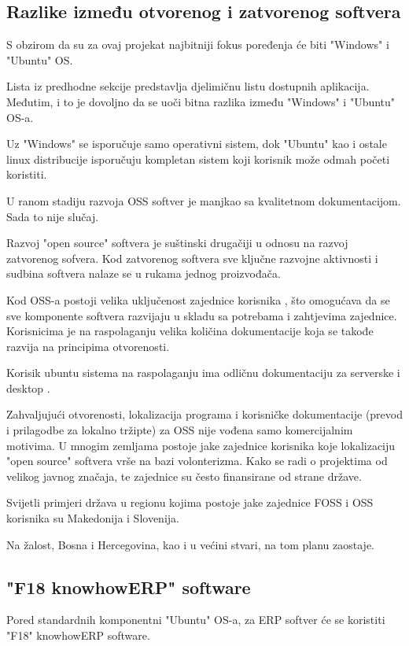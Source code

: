 \documentclass[times, utf8, seminar]{fit}
\begin{document}
 
\subsection{Razlike između otvorenog i zatvorenog softvera} 

S obzirom da su za ovaj projekat najbitniji fokus poređenja će biti "Windows" i "Ubuntu" OS. 

Lista iz predhodne sekcije predstavlja djelimičnu listu dostupnih aplikacija. Međutim, i to je dovoljno da se uoči bitna razlika između "Windows" i "Ubuntu" OS-a. 

Uz "Windows" se isporučuje samo operativni sistem, dok "Ubuntu" kao i ostale linux distribucije isporučuju kompletan sistem koji korisnik može odmah početi koristiti.

U ranom stadiju razvoja OSS softver je manjkao sa kvalitetnom dokumentacijom. Sada to nije slučaj. 

Razvoj "open source" softvera je suštinski drugačiji u odnosu na razvoj zatvorenog sofvera. Kod zatvorenog softvera sve ključne razvojne aktivnosti i sudbina softvera nalaze se u rukama jednog proizvođača.

Kod OSS-a postoji velika uključenost zajednice korisnika , što omogućava da se sve komponente softvera razvijaju u skladu sa potrebama i zahtjevima zajednice. Korisnicima je na raspolaganju velika količina dokumentacije koja se takođe razvija na principima otvorenosti.

Korisik ubuntu sistema na raspolaganju ima odličnu dokumentaciju za serverske \cite{ubuntudesktop} i desktop \cite{ubuntuserver}.

Zahvaljujući otvorenosti, lokalizacija programa i korisničke dokumentacije (prevod i prilagodbe za lokalno tržipte) za OSS nije vođena samo komercijalnim motivima. U mnogim zemljama postoje jake zajednice korisnika koje lokalizaciju "open source" softvera vrše na bazi volonterizma. Kako se radi o projektima od velikog javnog značaja, te zajednice su često finansirane od strane države.

Svijetli primjeri država u regionu kojima postoje jake zajednice FOSS  i OSS  korisnika su Makedonija i Slovenija.

Na žalost, Bosna i Hercegovina, kao i u većini stvari, na tom planu zaostaje. 

\subsection{"F18 knowhowERP" software}
Pored standardnih komponentni "Ubuntu" OS-a, za ERP softver će se koristiti "F18" knowhowERP software.
\end{document}
